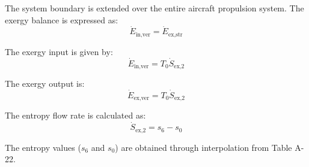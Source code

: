The system boundary is extended over the entire aircraft propulsion system. The exergy balance is expressed as:  
\[
\dot{E}_{\text{in,ver}} = \dot{E}_{\text{ex,str}}
\]

The exergy input is given by:  
\[
\dot{E}_{\text{in,ver}} = T_0 \dot{S}_{\text{ex,2}}
\]

The exergy output is:  
\[
\dot{E}_{\text{ex,ver}} = T_0 \dot{S}_{\text{ex,2}}
\]

The entropy flow rate is calculated as:  
\[
\dot{S}_{\text{ex,2}} = s_6 - s_0
\]

The entropy values (\( s_6 \) and \( s_0 \)) are obtained through interpolation from Table A-22.